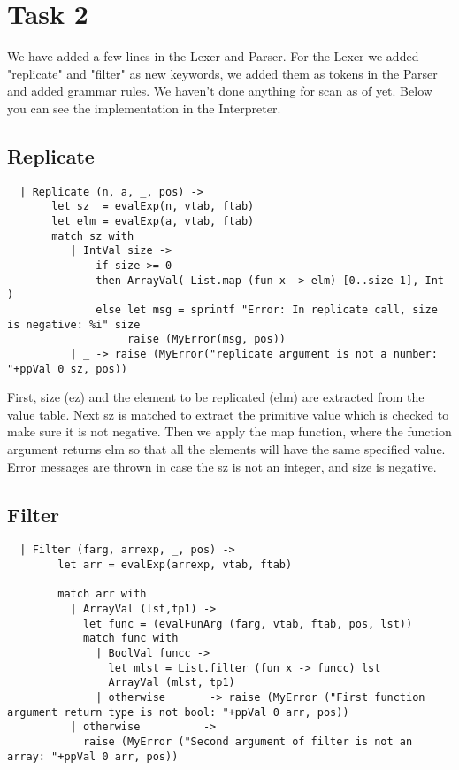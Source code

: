 \pagebreak
\section*{Task 2}
We have added a few lines in the Lexer and Parser. For the Lexer we added "replicate" and "filter" as new keywords, we added them as tokens in the Parser and added grammar rules. We haven't done anything for scan as of yet. Below you can see the implementation in the Interpreter.

\subsection*{Replicate}
\begin{verbatim}
  | Replicate (n, a, _, pos) ->
       let sz  = evalExp(n, vtab, ftab)
       let elm = evalExp(a, vtab, ftab)
       match sz with
          | IntVal size ->
              if size >= 0
              then ArrayVal( List.map (fun x -> elm) [0..size-1], Int )
              else let msg = sprintf "Error: In replicate call, size is negative: %i" size
                   raise (MyError(msg, pos))
          | _ -> raise (MyError("replicate argument is not a number: "+ppVal 0 sz, pos))
\end{verbatim}

First, size (ez) and the element to be replicated (elm) are extracted from the value table. Next sz is matched to extract the primitive value which is checked to make sure it is not negative. Then we apply the map function, where the function argument returns elm so that all the elements will have the same specified value. Error messages are thrown in case the sz is not an integer, and size is negative.

\subsection*{Filter}
\begin{verbatim}
  | Filter (farg, arrexp, _, pos) ->
        let arr = evalExp(arrexp, vtab, ftab)
        
        match arr with
          | ArrayVal (lst,tp1) ->
            let func = (evalFunArg (farg, vtab, ftab, pos, lst))
            match func with
              | BoolVal funcc ->
                let mlst = List.filter (fun x -> funcc) lst
                ArrayVal (mlst, tp1)
              | otherwise       -> raise (MyError ("First function argument return type is not bool: "+ppVal 0 arr, pos))
          | otherwise          -> 
            raise (MyError ("Second argument of filter is not an array: "+ppVal 0 arr, pos))
\end{verbatim}

